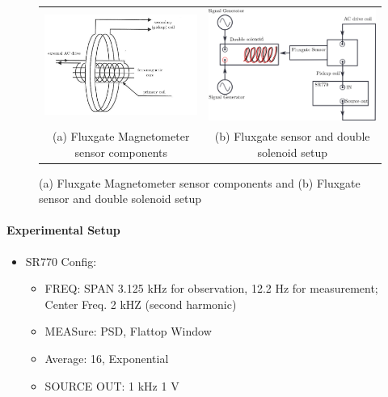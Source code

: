 \documentclass[../main.tex]{subfiles}
\begin{document}
\begin{figure}[ht]
    \centering
    \begin{tabular}{cc}
        \includegraphics[width=0.45\linewidth]{exp3_1.png} & \includegraphics[width=0.45\linewidth]{exp3_2.png} \\
        (a) Fluxgate Magnetometer sensor components & (b) Fluxgate sensor and double solenoid setup \\
    \end{tabular}
    \caption{(a) Fluxgate Magnetometer sensor components and (b) Fluxgate sensor and double solenoid setup}
    \label{fig:exp3_combined}
\end{figure}

\paragraph{Experimental Setup}
\begin{itemize}
    \item SR770 Config:
    \begin{itemize}
        \item FREQ: SPAN 3.125 kHz for observation, 12.2 Hz for measurement; Center Freq. 2 kHZ (second harmonic)
        \item MEASure: PSD, Flattop Window
        \item Average: 16, Exponential
        \item SOURCE OUT: 1 kHz 1 V 
    \end{itemize}
\end{itemize}
\end{document}
